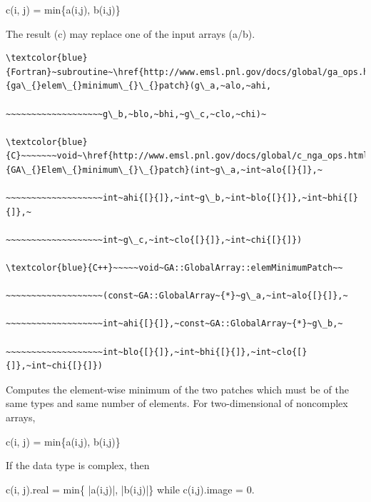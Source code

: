 c(i, j) = min\{a(i,j), b(i,j)\}

The result (c) may replace one of the input arrays (a/b). 
\begin{verbatim}
\textcolor{blue}{Fortran}~subroutine~\href{http://www.emsl.pnl.gov/docs/global/ga_ops.html\#ga_elem_minimum_patch}{ga\_{}elem\_{}minimum\_{}\_{}patch}(g\_a,~alo,~ahi,

~~~~~~~~~~~~~~~~~~~g\_b,~blo,~bhi,~g\_c,~clo,~chi)~

\textcolor{blue}{C}~~~~~~~void~\href{http://www.emsl.pnl.gov/docs/global/c_nga_ops.html\#ga_elem_minimum_patch}{GA\_{}Elem\_{}minimum\_{}\_{}patch}(int~g\_a,~int~alo{[}{]},~

~~~~~~~~~~~~~~~~~~~int~ahi{[}{]},~int~g\_b,~int~blo{[}{]},~int~bhi{[}{]},~

~~~~~~~~~~~~~~~~~~~int~g\_c,~int~clo{[}{]},~int~chi{[}{]})

\textcolor{blue}{C++}~~~~~void~GA::GlobalArray::elemMinimumPatch~~

~~~~~~~~~~~~~~~~~~~(const~GA::GlobalArray~{*}~g\_a,~int~alo{[}{]},~

~~~~~~~~~~~~~~~~~~~int~ahi{[}{]},~const~GA::GlobalArray~{*}~g\_b,~

~~~~~~~~~~~~~~~~~~~int~blo{[}{]},~int~bhi{[}{]},~int~clo{[}{]},~int~chi{[}{]})
\end{verbatim}
Computes the element-wise minimum of the two patches which must be
of the same types and same number of elements. For two-dimensional
of noncomplex arrays,

c(i, j) = min\{a(i,j), b(i,j)\}

If the data type is complex, then

c(i, j).real = min\{ |a(i,j)|, |b(i,j)|\} while c(i,j).image = 0.

